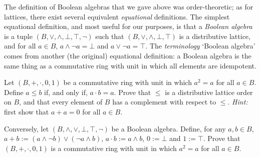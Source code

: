 The definition of Boolean algebras that we gave above was order-theoretic; as for lattices, there exist several equivalent \emph{equational} definitions. The simplest equational definition, and most useful for our purposes, is that a \emph{Boolean algebra} is a tuple $(B,\vee,\wedge,\bot,\top,\neg)$ such that $(B,\vee,\wedge,\bot,\top)$ is a distributive lattice, and for all $a \in B$, $a \wedge \neg a = \bot$ and $a \vee \neg a = \top$. The \emph{terminology} `Boolean algebra' comes from another (the original) equational definition: a Boolean algebra is the same thing as a commutative ring with unit in which all elements are idempotent.
\begin{exercise}\label{exe:BAeq}\easy
Let $(B,+,\cdot,0,1)$ be a commutative ring with unit in which $a^2 = a$ for all $a \in B$. Define $a \leq b$ if, and only if, $a \cdot b = a$. Prove that $\leq$ is a distributive lattice order on $B$, and that
 every element of $B$ has a complement with respect to $\leq$. \emph{Hint:} first show that $a + a = 0$ for all $a \in B$.

Conversely, let $(B,\wedge,\vee,\bot,\top,\neg)$ be a Boolean algebra. Define, for any $a, b \in B$, $a + b := (a \wedge \neg b) \vee (\neg a \wedge b)$, $a \cdot b := a \wedge b$, $0 := \bot$ and $1 := \top$. Prove that $(B,+,\cdot,0,1)$ is a commutative ring with unit in which $a^2 = a$ for all $a \in B$.
\end{exercise}

